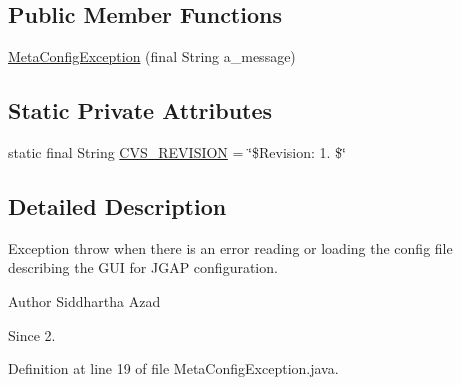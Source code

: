 \subsection*{Public Member Functions}
\begin{DoxyCompactItemize}
\item 
\hyperlink{classorg_1_1jgap_1_1data_1_1config_1_1_meta_config_exception_acd49d49ef4fee2ea2374ed0d0489033b}{Meta\-Config\-Exception} (final String a\-\_\-message)
\end{DoxyCompactItemize}
\subsection*{Static Private Attributes}
\begin{DoxyCompactItemize}
\item 
static final String \hyperlink{classorg_1_1jgap_1_1data_1_1config_1_1_meta_config_exception_a8d42e79f14258d394cf0cb11ce51f534}{C\-V\-S\-\_\-\-R\-E\-V\-I\-S\-I\-O\-N} = \char`\"{}\$Revision\-: 1. \$\char`\"{}
\end{DoxyCompactItemize}


\subsection{Detailed Description}
Exception throw when there is an error reading or loading the config file describing the G\-U\-I for J\-G\-A\-P configuration.

\begin{DoxyAuthor}{Author}
Siddhartha Azad 
\end{DoxyAuthor}
\begin{DoxySince}{Since}
2. 
\end{DoxySince}


Definition at line 19 of file Meta\-Config\-Exception.\-java.



